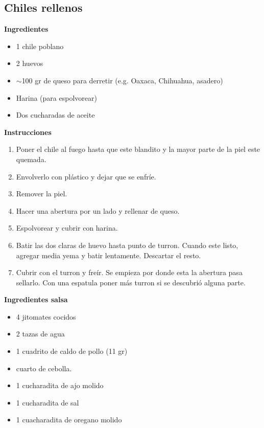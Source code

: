 \subsection{Chiles rellenos}
\textbf{Ingredientes}
\begin{itemize}
\item 1 chile poblano
\item 2 huevos
\item $\sim$100 gr de queso para derretir (e.g. Oaxaca, Chihuahua, asadero)
\item Harina (para espolvorear)
\item Dos cucharadas de aceite
\end{itemize}

\textbf{Instrucciones}
\begin{enumerate}
\item Poner el chile al fuego hasta que este blandito y la mayor parte de la piel este quemada.
\item Envolverlo con pl\'astico y dejar que se enfr\'ie.
\item Remover la piel.
\item Hacer una abertura por un lado y rellenar de queso.
\item Espolvorear y cubrir con harina.
\item Batir las dos claras de huevo hasta punto de turron. Cuando este listo, agregar media yema y batir lentamente. Descartar el resto.
\item Cubrir con el turron y fre\'ir. Se empieza por donde esta la abertura pasa sellarlo. Con una espatula poner m\'as turron si se descubri\'o alguna parte.
\end{enumerate}

\textbf{Ingredientes salsa}
\begin{itemize}
\item 4 jitomates cocidos
\item 2 tazas de agua
\item 1 cuadrito de caldo de pollo (11 gr)
\item {} cuarto de cebolla.
\item 1 cucharadita de ajo molido
\item 1 cucharadita de sal
\item 1 cuacharadita de oregano molido
\end{itemize}
